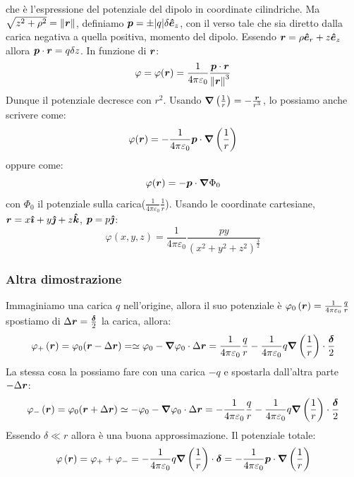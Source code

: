 che è l'espressione del potenziale del dipolo in coordinate cilindriche. Ma $\sqrt{z^2+\rho^2}=\left\lVert\boldsymbol{r}\right\rVert$, definiamo $\boldsymbol{p}=\pm |q|\delta \boldsymbol{\hat {e}}_z$, con il verso tale che sia diretto dalla carica negativa a quella positiva, momento del dipolo. Essendo $\boldsymbol{r}=\rho\boldsymbol{\hat {e}}_r+z\boldsymbol{\hat {e}}_z$ allora $\boldsymbol{p}\cdot\boldsymbol{r}=q\delta z$. In funzione di $\boldsymbol{r}$:
\begin{equation*}\varphi=\varphi(\boldsymbol{r})=\frac{1}{4\pi\varepsilon_0}\frac{\boldsymbol{p}\cdot\boldsymbol{r}}{{\left\lVert\boldsymbol{r}\right\rVert}^3}\end{equation*}
Dunque il potenziale decresce con $r^2$. Usando $\boldsymbol{\nabla}\left(\frac{1}{r}\right)=-\frac{\boldsymbol{r}}{r^3}$, lo possiamo anche scrivere come:
\begin{equation}
\varphi(\boldsymbol{r})=-\frac{1}{4\pi\varepsilon_0}\boldsymbol{p}\cdot\boldsymbol{\nabla}\left(\frac{1}{r}\right)
\end{equation}
oppure come:
\begin{equation}
\varphi(\boldsymbol{r})=-\boldsymbol{p}\cdot\boldsymbol{\nabla}\Phi_0
\end{equation}
con $\Phi_0$ il potenziale sulla carica($\frac{1}{4\pi\varepsilon_0}\frac{1}{r}$). Usando le coordinate cartesiane, $\boldsymbol{r}=x\boldsymbol{\hat {\imath}}+y\boldsymbol{\hat {\jmath}}+z\boldsymbol{\hat {k}}$, $\boldsymbol{p}=p\boldsymbol{\hat {\jmath}}$:
\begin{equation}
\varphi(x,y,z)=\frac{1}{4\pi\varepsilon_0}\frac{py}{\left(x^2+y^2+z^2\right)^\frac{3}{2}}
\end{equation}
\subsubsection{Altra dimostrazione}
Immaginiamo una carica $q$ nell'origine, allora il suo potenziale è $\varphi_0\left(\boldsymbol{r}\right)=\frac{1}{4\pi\varepsilon_0}\frac{q}{r}$
spostiamo di $\Delta\boldsymbol{r}=\frac{\boldsymbol{\delta}}{2}$ la carica, allora:
\begin{equation*}\varphi_+\left(\boldsymbol{r}\right)=\varphi_0(\boldsymbol{r}-\Delta \boldsymbol{r})=\simeq\varphi_0-\boldsymbol{\nabla}\varphi_0\cdot\Delta\boldsymbol{r}=\frac{1}{4\pi\varepsilon_0}\frac{q}{r}-\frac{1}{4\pi\varepsilon_0}q\boldsymbol{\nabla}\left(\frac{1}{r}\right)\cdot\frac{\boldsymbol{\delta}}{2}\end{equation*}
La stessa cosa la possiamo fare con una carica $-q$ e spostarla dall'altra parte $-\Delta\boldsymbol{r}$:
\begin{equation*}\varphi_-\left(\boldsymbol{r}\right)=\varphi_0(\boldsymbol{r}+\Delta \boldsymbol{r})\simeq-\varphi_0-\boldsymbol{\nabla}\varphi_0\cdot\Delta\boldsymbol{r}=-\frac{1}{4\pi\varepsilon_0}\frac{q}{r}-\frac{1}{4\pi\varepsilon_0}q\boldsymbol{\nabla}\left(\frac{1}{r}\right)\cdot\frac{\boldsymbol{\delta}}{2}\end{equation*}
Essendo $\delta\ll r$ allora è una buona approssimazione. Il potenziale totale:
\begin{equation*}\varphi\left(\boldsymbol{r}\right)=\varphi_++\varphi_-=-\frac{1}{4\pi\varepsilon_0}q\boldsymbol{\nabla}\left(\frac{1}{r}\right)\cdot\boldsymbol{\delta}=-\frac{1}{4\pi\varepsilon_0}\boldsymbol{p}\cdot\boldsymbol{\nabla}\left(\frac{1}{r}\right)\end{equation*}


